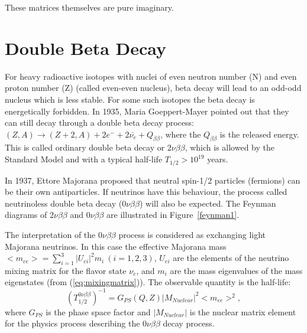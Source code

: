 These matrices themselves are pure imaginary. 




\section{Double Beta Decay}

For heavy radioactive isotopes with nuclei of even neutron number (N) and even proton number (Z) (called even-even nucleus), beta decay will lead to an odd-odd nucleus which is less stable. For some such isotopes the beta decay is energetically forbidden. In 1935, Maria Goeppert-Mayer pointed out that they can still decay through a double beta decay process: $(Z,A) \to (Z+2,A)+2e^{-}+2\bar{\nu_e}+Q_{\beta\beta}$, where the $Q_{\beta\beta}$ is the released energy. This is called ordinary double beta decay or $2\nu\beta\beta$, which is allowed by the Standard Model and with a typical half-life $T_{1/2}>10^{19}$ years\cite{martin}.

In 1937, Ettore Majorana proposed that neutral spin-1/2 particles (fermions) can be their own antiparticles\cite{majorana}. If neutrinos have this behaviour, the process called neutrinoless double beta decay ($0\nu\beta\beta$) will also be expected. The Feynman diagrams of $2\nu\beta\beta$ and $0\nu\beta\beta$ are illustrated in Figure~\ref{feynman1}.


The interpretation of the $0\nu\beta\beta$ process is considered as exchanging light Majorana neutrinos. In this case the effective Majorana mass $<m_{ee}>=\sum_{i=1}^{3} |U_{ei}|^2m_i~(i=1,2,3)$, $U_{ei}$ are the elements of the neutrino mixing matrix for the flavor state $\nu_e$, and $m_i$ are the mass eigenvalues of the mass eigenstates (from (\ref{eq:mixingmatrix})). The observable quantity is the half-life:
\[
(T^{0\nu\beta\beta}_{1/2})^{-1} = G_{PS}(Q,Z)|M_{Nuclear}|^2<m_{ee}>^2, 
\]
where $G_{PS}$ is the phase space factor and $|M_{Nuclear}|$ is the nuclear matrix element for the physics process describing the $0\nu\beta\beta$ decay process\cite{kaizuber}.

